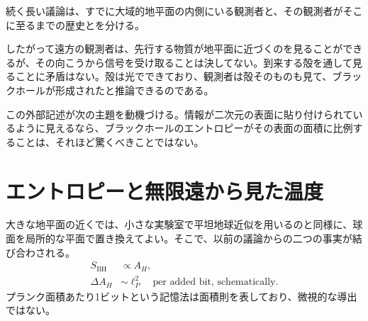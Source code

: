 続く長い議論は、すでに大域的地平面の内側にいる観測者と、その観測者がそこに至るまでの歴史とを分ける。

\begin{classroomqa}
\end{classroomqa}

したがって遠方の観測者は、先行する物質が地平面に近づくのを見ることができるが、その向こうから信号を受け取ることは決してない。到来する殻を通して見ることに矛盾はない。殻は光でできており、観測者は殻そのものも見て、ブラックホールが形成されたと推論できるのである。

\begin{classroomqa}
\end{classroomqa}

\begin{classroomqa}
\end{classroomqa}

この外部記述が次の主題を動機づける。情報が二次元の表面に貼り付けられているように見えるなら、ブラックホールのエントロピーがその表面の面積に比例することは、それほど驚くべきことではない。

\section{エントロピーと無限遠から見た温度}

大きな地平面の近くでは、小さな実験室で平坦地球近似を用いるのと同様に、球面を局所的な平面で置き換えてよい。そこで、以前の議論からの二つの事実が結び合わされる。
\begin{equation}
\begin{aligned}
S_{\mathrm{BH}}&\propto A_H,\\
\Delta A_H&\sim \ell_P^2
\quad\text{per added bit, schematically}.
\end{aligned}
\end{equation}
プランク面積あたり1ビットという記憶法は面積則を表しており、微視的な導出ではない。

